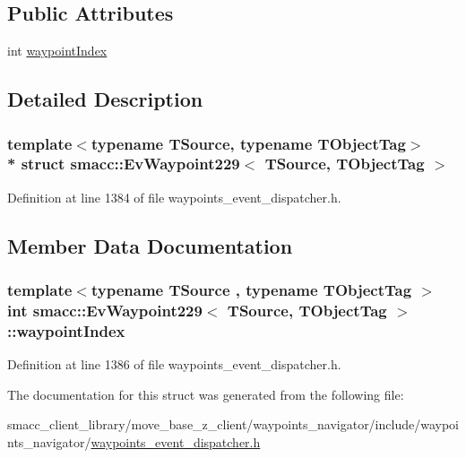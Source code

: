 \subsection*{Public Attributes}
\begin{DoxyCompactItemize}
\item 
int \hyperlink{structsmacc_1_1EvWaypoint229_a2a1276385a823b4b85f5cff40b290f6a}{waypoint\+Index}
\end{DoxyCompactItemize}


\subsection{Detailed Description}
\subsubsection*{template$<$typename T\+Source, typename T\+Object\+Tag$>$\\*
struct smacc\+::\+Ev\+Waypoint229$<$ T\+Source, T\+Object\+Tag $>$}



Definition at line 1384 of file waypoints\+\_\+event\+\_\+dispatcher.\+h.



\subsection{Member Data Documentation}
\subsubsection[{\texorpdfstring{waypoint\+Index}{waypointIndex}}]{\setlength{\rightskip}{0pt plus 5cm}template$<$typename T\+Source , typename T\+Object\+Tag $>$ int {\bf smacc\+::\+Ev\+Waypoint229}$<$ T\+Source, T\+Object\+Tag $>$\+::waypoint\+Index}\hypertarget{structsmacc_1_1EvWaypoint229_a2a1276385a823b4b85f5cff40b290f6a}{}\label{structsmacc_1_1EvWaypoint229_a2a1276385a823b4b85f5cff40b290f6a}


Definition at line 1386 of file waypoints\+\_\+event\+\_\+dispatcher.\+h.



The documentation for this struct was generated from the following file\+:\begin{DoxyCompactItemize}
\item 
smacc\+\_\+client\+\_\+library/move\+\_\+base\+\_\+z\+\_\+client/waypoints\+\_\+navigator/include/waypoints\+\_\+navigator/\hyperlink{waypoints__event__dispatcher_8h}{waypoints\+\_\+event\+\_\+dispatcher.\+h}\end{DoxyCompactItemize}
